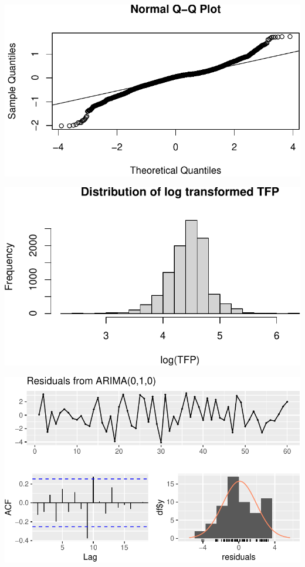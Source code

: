 \documentclass[
  letterpaper,
  DIV=11,
  numbers=noendperiod]{scrartcl}
\begin{document}
\includegraphics{Smith_Gabrielle_EDS222Final_files/figure-pdf/unnamed-chunk-11-2.pdf}

\includegraphics{Smith_Gabrielle_EDS222Final_files/figure-pdf/unnamed-chunk-11-3.pdf}

\includegraphics{Smith_Gabrielle_EDS222Final_files/figure-pdf/unnamed-chunk-12-1.pdf}
\end{document}
